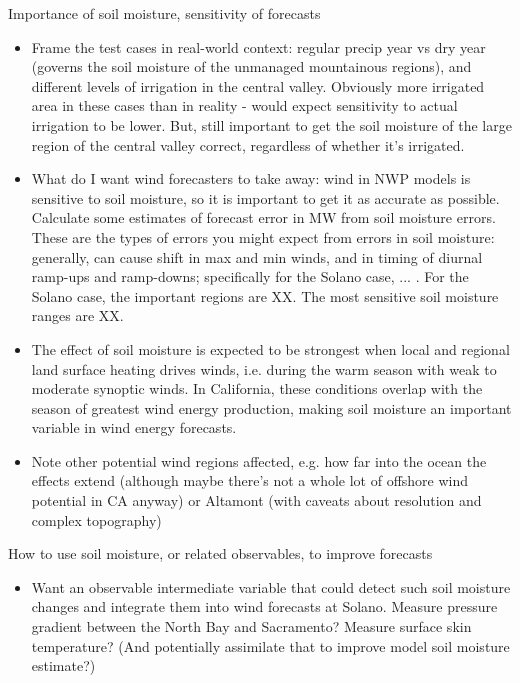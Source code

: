 Importance of soil moisture, sensitivity of forecasts
\begin{itemize}
\item Frame the test cases in real-world context: regular precip year vs dry year (governs the soil moisture of the unmanaged mountainous regions), and different levels of irrigation in the central valley.  Obviously more irrigated area in these cases than in reality - would expect sensitivity to actual irrigation to be lower.  But, still important to get the soil moisture of the large region of the central valley correct, regardless of whether it's irrigated.
\item What do I want wind forecasters to take away: wind in NWP models is sensitive to soil moisture, so it is important to get it as accurate as possible.  Calculate some estimates of forecast error in MW from soil moisture errors.  These are the types of errors you might expect from errors in soil moisture: generally, can cause shift in max and min winds, and in timing of diurnal ramp-ups and ramp-downs; specifically for the Solano case, ... .  For the Solano case, the important regions are XX.  The most sensitive soil moisture ranges are XX.  
\item The effect of soil moisture is expected to be strongest when local and regional land surface heating drives winds, i.e. during the warm season with weak to moderate synoptic winds.  In California, these conditions overlap with the season of greatest wind energy production, making soil moisture an important variable in wind energy forecasts.
\item Note other potential wind regions affected, e.g. how far into the ocean the effects extend (although maybe there's not a whole lot of offshore wind potential in CA anyway) or Altamont (with caveats about resolution and complex topography)
\end{itemize}

How to use soil moisture, or related observables, to improve forecasts
\begin{itemize}
\item Want an observable intermediate variable that could detect such soil moisture changes and integrate them into wind forecasts at Solano.  Measure pressure gradient between the North Bay and Sacramento?  Measure surface skin temperature?  (And potentially assimilate that to improve model soil moisture estimate?)
\end{itemize}

